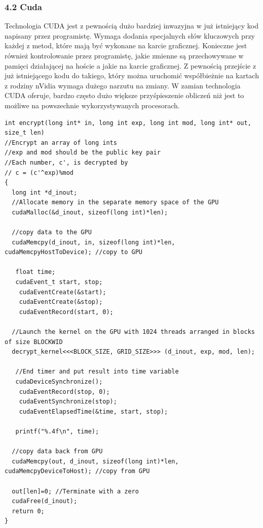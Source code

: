 \documentclass[a4paper,12pt]{article}
\begin{document}
\subsubsection*{4.2 Cuda}

Technologia CUDA jest z pewnością dużo bardziej inwazyjna w już istniejący kod napisany przez programistę. Wymaga dodania specjalnych słów kluczowych przy każdej z metod, które mają być wykonane na karcie graficznej. Konieczne jest również kontrolowanie przez programistę, jakie zmienne są przechowywane w pamięci działającej na hoście a jakie na karcie graficznej. Z pewnością przejście z już istniejącego kodu do takiego, który można uruchomić współbieżnie na kartach z rodziny nVidia wymaga dużego narzutu na zmiany. W zamian technologia CUDA oferuje, bardzo często dużo większe przyśpieszenie obliczeń niż jest to możliwe na powszechnie wykorzystywanych procesorach.


\begin{lstlisting}
int encrypt(long int* in, long int exp, long int mod, long int* out, size_t len)
//Encrypt an array of long ints
//exp and mod should be the public key pair
//Each number, c', is decrypted by
// c = (c'^exp)%mod
{
  long int *d_inout;
  //Allocate memory in the separate memory space of the GPU
  cudaMalloc(&d_inout, sizeof(long int)*len);

  //copy data to the GPU
  cudaMemcpy(d_inout, in, sizeof(long int)*len, cudaMemcpyHostToDevice); //copy to GPU

   float time;
   cudaEvent_t start, stop;
    cudaEventCreate(&start);
    cudaEventCreate(&stop);
    cudaEventRecord(start, 0);

  //Launch the kernel on the GPU with 1024 threads arranged in blocks of size BLOCKWID
  decrypt_kernel<<<BLOCK_SIZE, GRID_SIZE>>> (d_inout, exp, mod, len);

   //End timer and put result into time variable
   cudaDeviceSynchronize();             
    cudaEventRecord(stop, 0);
    cudaEventSynchronize(stop);
    cudaEventElapsedTime(&time, start, stop);

   printf("%.4f\n", time);

  //copy data back from GPU
  cudaMemcpy(out, d_inout, sizeof(long int)*len, cudaMemcpyDeviceToHost); //copy from GPU

  out[len]=0; //Terminate with a zero
  cudaFree(d_inout);
  return 0;
}

\end{lstlisting}
\end{document}
